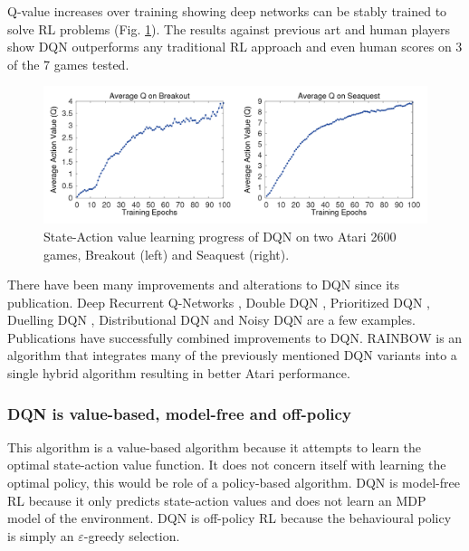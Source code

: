 \documentclass[10pt,journal,compsoc]{IEEEtran}
\begin{document}
Q-value increases over training showing deep networks can be stably trained to solve RL problems (Fig. \ref{dqn_learning}). The results against previous art and human players show DQN outperforms any traditional RL approach and even human scores on 3 of the 7 games tested.

\begin{figure}[!h]
\centering
\includegraphics[width=\linewidth]{dqn_learning}
\caption{State-Action value learning progress of DQN on two Atari 2600 games, Breakout (left) and Seaquest (right).}
\label{dqn_learning}
\end{figure}

There have been many improvements and alterations to DQN since its publication. Deep Recurrent Q-Networks \cite{Haus:DRQN}, Double DQN \cite{van2016ddqn}, Prioritized DQN \cite{schaul2015prioritized}, Duelling DQN \cite{wang2015dueling}, Distributional DQN \cite{bellemare2017distributional} and Noisy DQN \cite{fortunato2017noisy} are a few examples.  Publications have successfully combined improvements to DQN. RAINBOW \cite{hessel2018rainbow} is an algorithm that integrates many of the previously mentioned DQN variants into a single hybrid algorithm resulting in better Atari performance. 
\subsubsection{DQN is value-based, model-free and off-policy}
This algorithm is a value-based algorithm because it attempts to learn the optimal state-action value function. It does not concern itself with learning the optimal policy, this would be role of a policy-based algorithm. DQN is model-free RL because it only predicts state-action values and does not learn an MDP model of the environment. DQN is off-policy RL because the behavioural policy is simply an $\varepsilon$-greedy selection.
\end{document}
